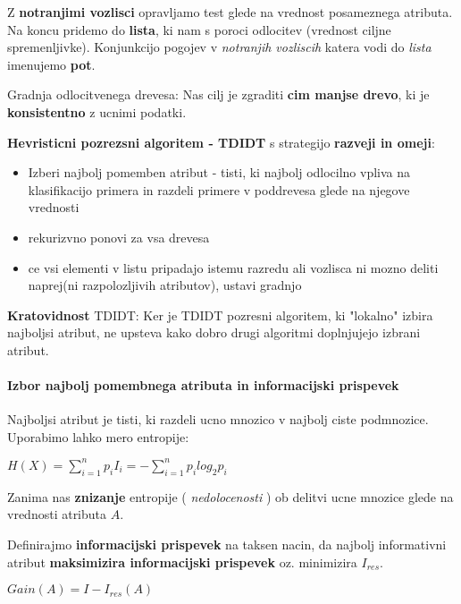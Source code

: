 \documentclass{article}
\begin{document}
\begin{multicols}{2}
Z \textbf{notranjimi vozlisci} opravljamo test glede na vrednost posameznega atributa. Na koncu pridemo do \textbf{lista}, ki nam
s poroci odlocitev (vrednost ciljne spremenljivke). Konjunkcijo pogojev v \textit{notranjih vozliscih} katera vodi do \textit{lista}
imenujemo \textbf{pot}.

Gradnja odlocitvenega drevesa:
Nas cilj je zgraditi \textbf{cim manjse drevo}, ki je \textbf{konsistentno} z ucnimi podatki.

\textbf{Hevristicni pozrezsni algoritem - TDIDT} s strategijo \textbf{razveji in omeji}:
\begin{itemize}
  \item Izberi najbolj pomemben atribut - tisti, ki najbolj odlocilno vpliva na klasifikacijo primera in razdeli
    primere v poddrevesa glede na njegove vrednosti
  \item  rekurizvno ponovi za vsa drevesa
  \item ce vsi elementi v listu pripadajo istemu razredu ali vozlisca ni mozno deliti naprej(ni razpolozljivih atributov), ustavi gradnjo
\end{itemize}

\textbf{Kratovidnost} TDIDT:
Ker je TDIDT pozresni algoritem, ki "lokalno" izbira najboljsi atribut, ne upsteva kako dobro drugi algoritmi
doplnjujejo izbrani atribut.


\paragraph{Izbor najbolj pomembnega atributa in informacijski prispevek}
Najboljsi atribut je tisti, ki razdeli ucno mnozico v najbolj ciste podmnozice.
Uporabimo lahko mero entropije:
\begin{center}
    \begin{math}
        H(X) = \sum_{i=1}^{n} p_i I_i = -\sum_{i=1}^{n} p_i log_2 p_i
    \end{math}
\end{center}

Zanima nas \textbf{znizanje} entropije ( \textit{nedolocenosti} ) ob delitvi ucne mnozice glede
na vrednosti atributa $A$. 

Definirajmo \textbf{informacijski prispevek} na taksen nacin,
da najbolj informativni atribut \textbf{maksimizira informacijski prispevek} oz. minimizira $I_{res}$.
\begin{center}
  \begin{math}
    Gain(A) = I - I_{res}(A)
  \end{math}


\end{center}
\end{multicols}
\end{document}
